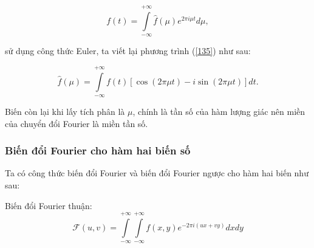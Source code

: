 \documentclass[12pt,a4paper]{report}
\numberwithin{equation}{section}
\theoremstyle{definition} %
\begin{document}
\begin{equation}
	\label{136}
    f(t)=\int\limits_{-\infty}^{+\infty}\hat{f}(\mu)e^{2\pi i \mu t}d\mu,
\end{equation}

sử dụng công thức Euler, ta viết lại phương trình (\ref{135}) như sau:

\begin{equation}
	\label{137}
     \hat{f}(\mu)=\int\limits_{-\infty}^{+\infty}f(t)[\cos(2\pi\mu t)-i\sin(2\pi\mu t)]dt.
\end{equation}

Biến còn lại khi lấy tích phân là $\mu$, chính là tần số của hàm lượng giác nên miền của chuyển đổi Fourier là miền tần số.

\subsubsection{Biến đổi Fourier cho hàm hai biến số}

Ta có công thức biến đổi Fourier và biến đổi Fourier ngược cho hàm hai biến như sau:

Biến đổi Fourier thuận:
\begin{equation}
\mathcal{F}(u,v) = \int\limits_{-\infty}^{+\infty}\int\limits_{-\infty}^{+\infty}f(x,y)e^{-2\pi i(ux+vy)}dxdy
\end{equation}
\end{document}
